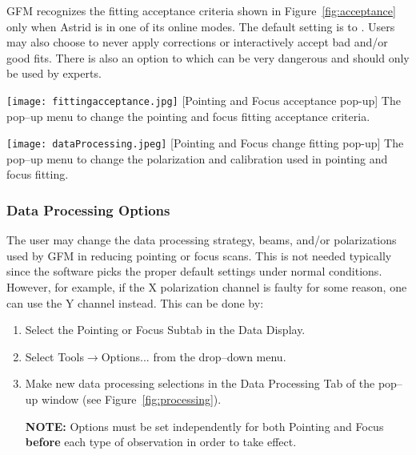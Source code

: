 \noindent \gls{GFM} recognizes the fitting acceptance criteria shown in
Figure~\ref{fig:acceptance} only when \gls{Astrid} is in one of its online modes.
The default setting is to .  Users may also choose to never apply corrections or interactively accept
bad and/or good fits.  There is also an option to  which
can be very dangerous and should only be used by experts.

\vspace{2.5mm}

\noindent\begin{minipage}[t]{0.485\linewidth}
\setlength{\abovecaptionskip}{0pt}\setlength{\belowcaptionskip}{0pt}
\texttt{[image: fittingacceptance.jpg]}
[Pointing and Focus acceptance pop-up]
{The pop--up menu to change the pointing and focus fitting acceptance criteria. 
\label{fig:acceptance} }
\end{minipage}
\hfill
\begin{minipage}[t]{0.485\linewidth}
\setlength{\abovecaptionskip}{0pt}\setlength{\belowcaptionskip}{0pt}
\texttt{[image: dataProcessing.jpeg]}
[Pointing and Focus change fitting pop-up]
{The pop--up menu to change the polarization and calibration used in pointing and
focus fitting. \label{fig:processing} }
\end{minipage}


\subsubsection{Data Processing Options}\label{sec:gfmdataprocessing}

The user may change the data processing strategy, beams, and/or polarizations used 
by \gls{GFM} in reducing pointing or focus scans.  This is not needed typically since the
software picks the proper default settings under normal conditions.  However, for
example, if the X polarization channel is faulty for some reason, one can use the Y
channel instead. This can be done by:

\begin{enumerate}[label=\bfseries{Step \arabic*.},leftmargin=*,%
itemsep=0pt]
\item Select the Pointing or Focus Subtab in the Data Display.
\item Select {\btt Tools}$\rightarrow${\btt Options...} from the drop--down menu.
\item Make new data processing selections in the Data Processing Tab of the pop--up
window (see Figure~\ref{fig:processing}).
\item[{\bf NOTE:}] Options must be set independently for both Pointing and Focus
{\bf before} each type of observation in order to take effect.
\end{enumerate}

